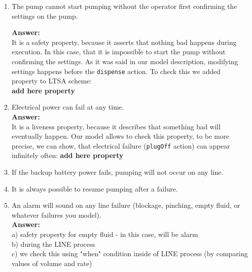 \documentclass{article}
\begin{document}
\begin{enumerate}
    \item The pump cannot start pumping without the operator first confirming the settings on the pump.
    
    \textbf{Answer:}\\
    It is a safety property, because it asserts that nothing bad happens during execution. In this case, that it is impossible to start the pump without confirming the settings. As it was said in our model description, modifying settings happens before the \verb|dispense| action. To check this we added property to LTSA scheme:\\
    \textbf{add here property}
    
    \item Electrical power can fail at any time.\\
    \textbf{Answer:}\\
    It is a liveness property, because it describes that something bad will eventually happen. Our model allows to check this property, to be more precise, we can show, that electrical failure (\verb|plugOff| action) can appear infinitely often:
     \textbf{add here property}
      
    
    \item If the backup battery power fails, pumping will not occur on any line.
    \item It is always possible to resume pumping after a failure.
    \item An alarm will sound on any line failure (blockage, pinching, empty fluid, or
whatever failures you model).\\
    \textbf{Answer:}
\\
a) safety property for empty fluid - in this case, will be alarm\\
b) during the LINE process\\
c) we check this using "when" condition inside of LINE process (by comparing values of volume and rate)



\end{enumerate}
\end{document}
